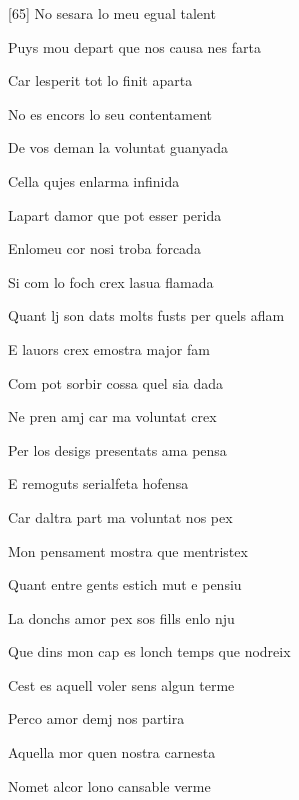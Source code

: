\documentclass[12pt]{article}
\begin{document}
\begin{estrofa}

 [65] No sesara lo meu egual talent

 Puys mou depart que nos causa nes farta

 Car lesperit tot lo finit aparta

 No es encors lo seu contentament

 De vos deman la voluntat guanyada

 Cella qujes enlarma infinida

 Lapart damor que pot esser perida

 Enlomeu cor nosi troba forcada

\end{estrofa}



\begin{estrofa}

 Si com lo foch crex lasua flamada

 Quant lj son dats molts fusts per quels aflam

 E lauors crex emostra major fam

 Com pot sorbir cossa quel sia dada

 Ne pren amj car ma voluntat crex

 Per los desigs presentats ama pensa

 E remoguts serialfeta hofensa

 Car daltra part ma voluntat nos pex

\end{estrofa}



\begin{estrofa}

 Mon pensament mostra que mentristex

 Quant entre gents estich mut e pensiu

 La donchs amor pex sos fills enlo nju

 Que dins mon cap es lonch temps que nodreix

 Cest es aquell voler sens algun terme

 Perco amor demj nos partira

 Aquella mor quen nostra carnesta

 Nomet alcor lono cansable verme

\end{estrofa}
\end{document}
